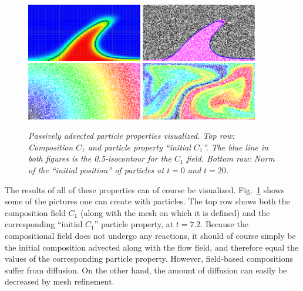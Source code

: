 \documentclass{article}
\begin{document}
\begin{figure}
  \centering
  \phantom{.}
  \hfill
  \includegraphics[width=0.45\textwidth]{cookbooks/composition-passive-particles-properties/composition-C1.png}
  \hfill
  \includegraphics[width=0.45\textwidth]{cookbooks/composition-passive-particles-properties/particles-C1.png}
  \phantom{.}
  \\
  \phantom{.}
  \hfill
  \includegraphics[width=0.45\textwidth]{cookbooks/composition-passive-particles-properties/initial-position-00000.png}
  \hfill
  \includegraphics[width=0.45\textwidth]{cookbooks/composition-passive-particles-properties/initial-position-00199.png}
  \phantom{.}
  \caption{\it Passively advected particle properties visualized. Top row:
  Composition $C_1$ and particle property ``initial $C_1$''. The blue line in both
  figures is the 0.5-isocontour for the $C_1$ field. Bottom row: Norm of the
  ``initial position'' of particles at $t=0$ and $t=20$.}
  \label{fig:composition-passive-particles-properties}
\end{figure}

The results of all of these properties can of course be visualized.
Fig.~\ref{fig:composition-passive-particles-properties} shows some of the pictures
one can create with particles.
The top row shows both the composition field $C_1$ (along with the mesh on
which it is defined) and the corresponding ``initial $C_1$'' particle property,
at $t=7.2$. Because the compositional field does not undergo any reactions, it should of
course simply be the initial composition advected along with the flow field,
and therefore equal the values of the corresponding particle property. However,
field-based compositions suffer from diffusion. On the other hand, the amount
of diffusion can easily be decreased by mesh refinement.  
\end{document}
